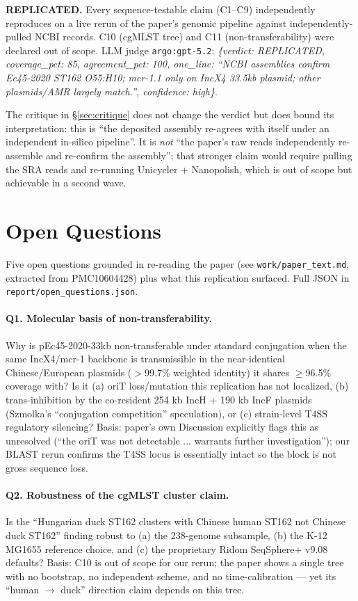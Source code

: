 \documentclass[11pt]{article}
\begin{document}
\textbf{REPLICATED.} Every sequence-testable claim (C1--C9) independently reproduces on a live
rerun of the paper's genomic pipeline against independently-pulled NCBI records. C10 (cgMLST tree)
and C11 (non-transferability) were declared out of scope. LLM judge
\texttt{argo:gpt-5.2}: \emph{\{verdict: REPLICATED, coverage\_pct: 85, agreement\_pct: 100,
one\_line: ``NCBI assemblies confirm Ec45-2020 ST162 O55:H10; mcr-1.1 only on IncX4 33.5kb
plasmid; other plasmids/AMR largely match.'', confidence: high\}}.

The critique in \S\ref{sec:critique} does not change the verdict but does bound its
interpretation: this is ``the deposited assembly re-agrees with itself under an independent
in-silico pipeline''. It is \emph{not} ``the paper's raw reads independently re-assemble and
re-confirm the assembly''; that stronger claim would require pulling the SRA reads and re-running
Unicycler + Nanopolish, which is out of scope but achievable in a second wave.

\section{Open Questions}
\label{sec:openq}

Five open questions grounded in re-reading the paper (see \texttt{work/paper\_text.md}, extracted
from PMC10604428) plus what this replication surfaced. Full JSON in
\texttt{report/open\_questions.json}.

\paragraph{Q1. Molecular basis of non-transferability.} Why is pEc45-2020-33kb non-transferable
under standard conjugation when the same IncX4/mcr-1 backbone is transmissible in the near-identical
Chinese/European plasmids ($>$99.7\% weighted identity) it shares $\geq$96.5\% coverage with? Is it
(a) oriT loss/mutation this replication has not localized, (b) trans-inhibition by the co-resident
254 kb IncH + 190 kb IncF plasmids (Szmolka's ``conjugation competition'' speculation), or
(c) strain-level T4SS regulatory silencing? Basis: paper's own Discussion explicitly flags this
as unresolved (``the oriT was not detectable ... warrants further investigation''); our BLAST
rerun confirms the T4SS locus is essentially intact so the block is not gross sequence loss.

\paragraph{Q2. Robustness of the cgMLST cluster claim.} Is the ``Hungarian duck ST162 clusters
with Chinese human ST162 not Chinese duck ST162'' finding robust to (a) the 238-genome subsample,
(b) the K-12 MG1655 reference choice, and (c) the proprietary Ridom SeqSphere+ v9.08 defaults?
Basis: C10 is out of scope for our rerun; the paper shows a single tree with no bootstrap,
no independent scheme, and no time-calibration --- yet its ``human $\to$ duck'' direction claim
depends on this tree.
\end{document}
